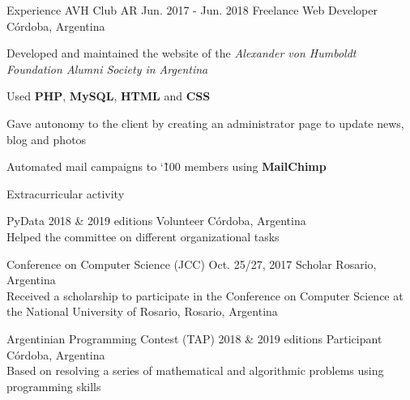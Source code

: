\documentclass{curriculum}
\begin{document}
\begin{cvsection}{Experience}
    \makesectionitemheader
        {AVH Club AR}                                       {Jun. 2017 - Jun. 2018}
        {Freelance Web Developer}                              {Córdoba, Argentina}

        \begin{sectionitemlist}
        \item{
            Developed and maintained the website of the
            \textit{Alexander von Humboldt Foundation Alumni Society in Argentina}
        }
        \item{
            Used \textbf{PHP}, \textbf{MySQL}, \textbf{HTML} and \textbf{CSS}
        }
        \item{
            Gave autonomy to the client by creating
            an administrator page to update news, blog and photos
        }
        \item{
            Automated mail campaigns to  \char`\~ 100
            members using \textbf{MailChimp}
        }
        \end{sectionitemlist}

\end{cvsection}


\begin{cvsection}{Extracurricular activity}

    \makesectionitemheader
        {PyData}                                            {2018 \& 2019 editions}
        {Volunteer}                                         {Córdoba, Argentina} \\
        \vspace{0.5ex}
        {Helped the committee on different organizational tasks}

    \makesectionitemheader
        {Conference on Computer Science (JCC)}              {Oct. 25/27, 2017}
        {Scholar}                                           {Rosario, Argentina} \\
        \vspace{0.5ex}
        {
            Received a scholarship to participate in the Conference on
            Computer Science at the National University of Rosario, Rosario, Argentina
        }

    \makesectionitemheader
        {Argentinian Programming Contest (TAP)}             {2018 \& 2019 editions}
        {Participant}                                       {Córdoba, Argentina} \\
        \vspace{0.5ex}
        {
            Based on resolving a series of mathematical and algorithmic
            problems using programming skills
        }

\end{cvsection}

\end{document}
